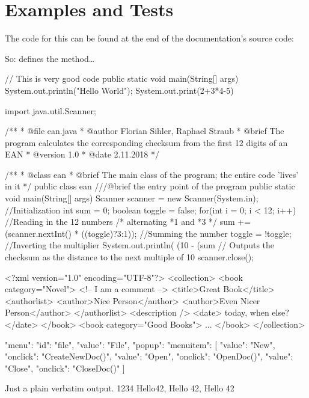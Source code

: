 \documentclass{sopra-base}
\begin{document}
\clearpage

\section{Examples and Tests}

The code for this can be found at the end of the documentation's source code:

So:  defines the  method\ldots\blindtext[1]
\begin{plainjava}
// This is very good code
public static void main(String[] args){
    System.out.println("Hello World");
    System.out.print(2+3*4-5)
}
\end{plainjava}

\begin{java}
import java.util.Scanner;

/**
 *  @file ean.java
 *  @author Florian Sihler, Raphael Straub
 *  @brief The program calculates the corresponding checksum from the first 12 digits of an EAN
 *  @version 1.0
 *  @date 2.11.2018
 */

/**
 * @class ean
 * @brief The main class of the program; the entire code 'lives' in it
 */
public class ean {
    ///@brief the entry point of the program
    public static void main(String[] args){
        Scanner scanner = new Scanner(System.in); //Initialization
        int sum = 0; boolean toggle = false;
        for(int i = 0; i < 12; i++){ //Reading in the 12 numbers
                                         /* alternating *1 and *3 */
            sum += (scanner.nextInt() * ((toggle)?3:1)); //Summing the number
            toggle = !toggle; //Inverting the multiplier
        }
        System.out.println( (10 - (sum %
        // Outputs the checksum as the distance to the next multiple of 10
        scanner.close();
    }
}
\end{java}

\begin{xml*}[morekeywords={[3]{collection,book,title,authorlist,description,date,author}}]
<?xml version="1.0" encoding="UTF-8"?>
<collection>
    <book category="Novel">
        <!-- I am a comment -->
        <title>Great Book</title>
        <authorlist>
            <author>Nice Person</author>
            <author>Even Nicer Person</author>
        </authorlist>
        <description />
        <date> today, when else? </date>
    </book>
    <book category="Good Books">
        ...
    </book>
</collection>
\end{xml*}

\begin{json}
{"menu": {
  "id": "file",
  "value": "File",
  "popup": {
    "menuitem": [
      {"value": "New", "onclick": "CreateNewDoc()"},
      {"value": "Open", "onclick": "OpenDoc()"},
      {"value": "Close", "onclick": "CloseDoc()"}
    ]
  }
}}
\end{json}

\begin{void}
Just a plain verbatim output. 1234 Hello42, Hello 42, Hello 42
\end{void}
\end{document}
